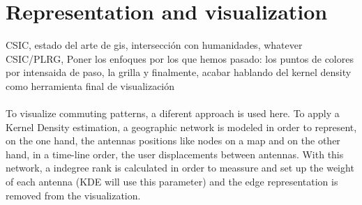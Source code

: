 \newpage

\section{Representation and visualization}

 {\color{red} CSIC, estado del arte de gis, intersección con humanidades, whatever}
\\
 {\color{red} CSIC/PLRG, Poner los enfoques por los que hemos pasado: los puntos de colores por intensaida de paso, la grilla y finalmente, acabar hablando del kernel density como herramienta final de visualización} 
 \\
 \\
To visualize commuting patterns, a diferent approach is used here. To apply a Kernel Density estimation, a geographic network is modeled in order to represent, on the one hand, the antennas positions like nodes on a map and on the other hand, in a time-line order, the user displacements between antennas. With this network, a indegree rank is calculated in order to meassure and set up the weight of each antenna (KDE will use this parameter) and the edge representation is removed from the visualization.
